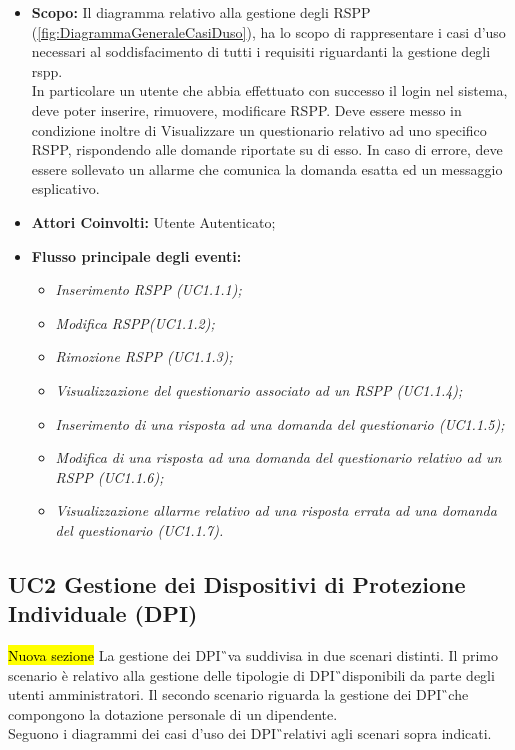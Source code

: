 		\begin{itemize}
			\item \textbf{Scopo:} Il diagramma relativo alla gestione degli RSPP (\autoref{fig:DiagrammaGeneraleCasiDuso}), ha lo scopo di rappresentare i casi d'uso necessari al soddisfacimento di tutti i requisiti riguardanti la gestione degli rspp. \\
			In particolare un utente che abbia effettuato con successo il login nel sistema, deve poter inserire, rimuovere, modificare  RSPP. Deve essere messo in condizione inoltre di Visualizzare un questionario relativo ad uno specifico RSPP, rispondendo alle domande riportate su di esso. In caso di errore, deve essere sollevato un allarme che comunica la domanda esatta ed un messaggio esplicativo.
			\item \textbf{Attori Coinvolti:} Utente Autenticato;
			\item \textbf{Flusso principale degli eventi:} 
			\begin{itemize}
				\item \textit{Inserimento RSPP (UC1.1.1);}
				\item \textit{Modifica RSPP(UC1.1.2);}
				\item \textit{Rimozione RSPP (UC1.1.3);}
				\item \textit{Visualizzazione del questionario associato ad un RSPP (UC1.1.4);}
				\item \textit{Inserimento di una risposta ad una domanda del questionario (UC1.1.5);}
				\item \textit{Modifica di una risposta ad una domanda del questionario relativo ad un RSPP (UC1.1.6);}
				\item \textit{ Visualizzazione allarme relativo ad una risposta errata ad una domanda del questionario (UC1.1.7).}
			\end{itemize}
		\end{itemize}
			
	\subsection{UC2 Gestione dei Dispositivi di Protezione Individuale (DPI)}
		\label{section:UC2}
		\hl{Nuova sezione}
		La gestione dei  \gls{DPI}\G\ va suddivisa in due scenari distinti. Il primo scenario è relativo alla gestione delle tipologie di \gls{DPI}\G\ disponibili da parte degli utenti amministratori. Il secondo scenario riguarda la gestione dei \gls{DPI}\G\ che compongono la dotazione personale di un dipendente. \\
		Seguono i diagrammi dei casi d'uso dei \gls{DPI}\G\ relativi agli scenari sopra indicati.

